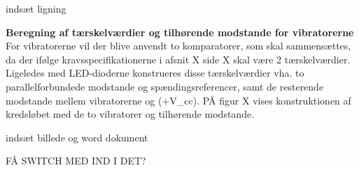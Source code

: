 indsæt ligning 

\textbf{Beregning af tærskelværdier og tilhørende modstande for vibratorerne}
For vibratorerne vil der blive anvendt to komparatorer, som skal sammensættes, da der ifølge kravsspecifikationerne i afsnit X side X skal være 2 tærskelværdier. Ligeledes med LED-dioderne konstrueres disse tærskelværdier vha. to parallelforbundede modstande og spændingsreferencer, samt de resterende modstande mellem vibratorerne og (+V_{cc}). PÅ figur X vises konstruktionen af kredsløbet med de to vibratorer og tilhørende modstande.

indsæt billede og word dokument



FÅ SWITCH MED IND I DET? 